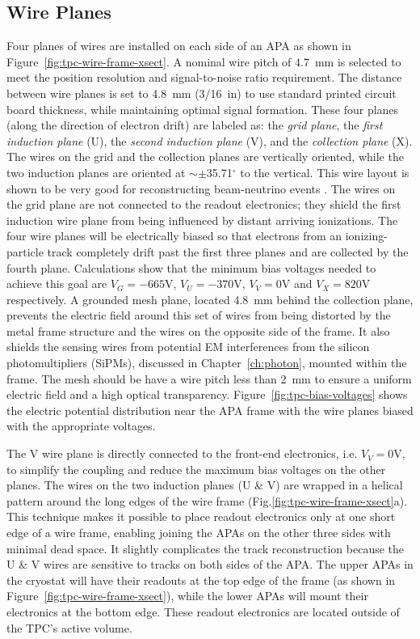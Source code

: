 \subsection{Wire Planes}


Four planes of wires are installed on each side of an APA as shown in Figure~\ref{fig:tpc-wire-frame-xsect}.
A nominal wire pitch of 4.7~mm is selected to meet the position resolution  and signal-to-noise ratio requirement. The distance between wire planes is set to 4.8~mm (3/16~in) to use standard printed circuit board thickness, while maintaining optimal signal formation.  These four planes (along the direction of electron drift) are labeled as: the {\em grid plane}, the {\em first induction plane} (U), the {\em second induction plane} (V), and the {\em collection plane} (X).
The wires on the grid and the collection planes
are vertically oriented, while the two induction planes are oriented 
at $\sim\pm$35.71$^\circ$ to the vertical. This wire layout is shown to be very good for reconstructing beam-neutrino events \cite{wire-orientation}. The wires on the grid plane are not 
connected to the readout electronics; they shield the first induction wire plane from being influenced by distant arriving ionizations. The four wire planes 
will be electrically biased so that electrons from an ionizing-particle
track completely drift past the first three planes and are collected by the 
fourth plane. Calculations show that the minimum bias voltages 
needed to achieve this goal are $V_G= -665$V, $V_U=-370$V, $V_V=0$V and $V_X=820$V 
respectively.  A grounded mesh plane, located 4.8~mm behind the collection plane, prevents the electric field around this set of wires from being distorted by the metal frame structure and the wires on the opposite side of the frame. It also shields the sensing wires from potential EM interferences from the silicon photomultipliers (SiPMs), discussed in Chapter~\ref{ch:photon}, mounted within the frame.  The mesh should be have a wire pitch less than 2~mm to ensure a uniform electric field and a high optical transparency.  Figure~\ref{fig:tpc-bias-voltages} shows the electric potential distribution near the APA frame with the wire planes biased with the appropriate voltages. 

The V wire plane is directly connected to the front-end electronics, i.e. $V_V=0$V, to simplify the coupling and 
reduce the maximum bias voltages on the other planes. The wires on the two induction planes (U \& V) are wrapped in a helical pattern around the long edges of the wire frame 
(Fig.\ref{fig:tpc-wire-frame-xsect}a). This technique makes it possible to place readout 
electronics only at one short edge of a wire frame, enabling joining the APAs on the other three sides with minimal dead space.  It slightly complicates 
the track reconstruction because the U \& V wires are sensitive to tracks on 
both sides of the APA.  The upper APAs in the cryostat will have their readouts
at the top edge of the frame (as shown in Figure~\ref{fig:tpc-wire-frame-xsect}), 
while the lower APAs will mount their electronics at the bottom edge.  These readout electronics are located outside of the TPC's active volume.

